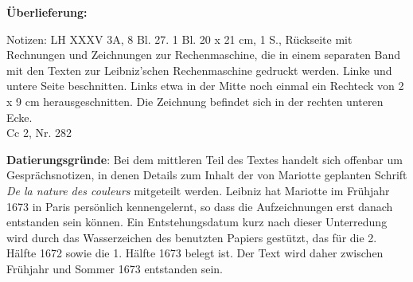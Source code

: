       
               
                \begin{ledgroupsized}[r]{120mm}
                \footnotesize 
                \pstart                
                \noindent\textbf{\"{U}berlieferung:}   
                \pend
                \end{ledgroupsized}
            
              
                            \begin{ledgroupsized}[r]{114mm}
                            \footnotesize 
                            \pstart \parindent -6mm
                            Notizen: LH XXXV 3A, 8 Bl. 27. 1 Bl. 20 x 21 cm, 1 S., R\"{u}ckseite mit Rechnungen und Zeichnungen zur Rechenmaschine, die in einem separaten Band mit den Texten zur Leibniz'schen Rechenmaschine gedruckt werden. Linke und untere Seite beschnitten. Links etwa in der Mitte noch einmal ein Rechteck von 2 x 9 cm herausgeschnitten. Die Zeichnung befindet sich in der rechten unteren Ecke.\\Cc 2, Nr. 282 \pend
                            \end{ledgroupsized}
                \vspace*{5mm}
                \begin{ledgroup}
                \footnotesize 
                \pstart
            \noindent\footnotesize{\textbf{Datierungsgr\"{u}nde}: Bei dem mittleren Teil des Textes handelt sich offenbar um Gespr\"{a}chsnotizen, in denen Details zum Inhalt der von Mariotte\protect{} geplanten Schrift \cite{00186}\textit{De la nature des couleurs} mitgeteilt werden. Leibniz hat Mariotte im Fr\"{u}hjahr 1673 in Paris pers\"{o}nlich kennengelernt, so dass die Aufzeichnungen erst danach entstanden sein k\"{o}nnen. Ein Entstehungsdatum kurz nach dieser Unterredung wird durch das Wasserzeichen des benutzten Papiers gest\"{u}tzt, das f\"{u}r die 2. H\"{a}lfte 1672 sowie die 1. H\"{a}lfte 1673 belegt ist. Der Text wird daher zwischen Fr\"{u}hjahr und Sommer 1673 entstanden sein.}
                \pend
                \end{ledgroup}
            
